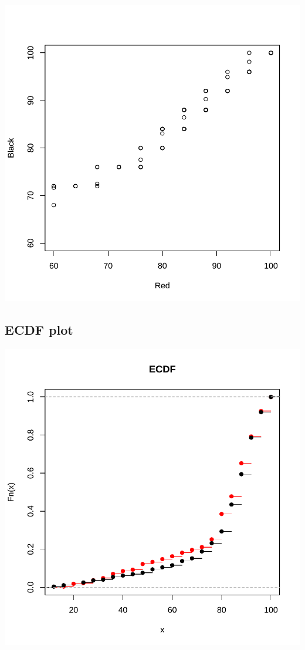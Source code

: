 \documentclass[
]{book}
\begin{document}
\includegraphics{_main_files/figure-latex/qqplots-1.pdf}

\subsection{ECDF plot}\label{ecdf-plot}

\includegraphics{_main_files/figure-latex/ECDF-1.pdf}
\end{document}

